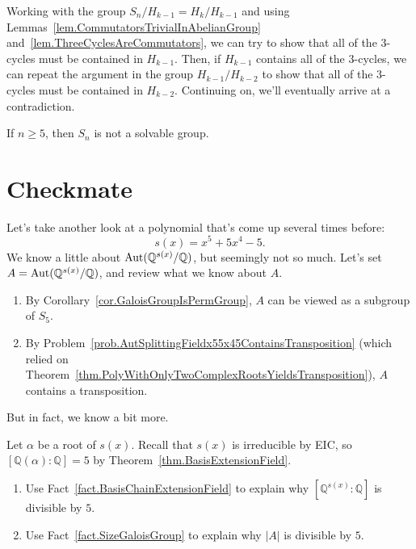 Working with the group $S_n/ H_{k-1} = H_k/ H_{k-1}$ and using Lemmas~\ref{lem.CommutatorsTrivialInAbelianGroup} and~\ref{lem.ThreeCyclesAreCommutators}, we can try to show that all of the $3$-cycles must be contained in $H_{k-1}$. Then, if $H_{k-1}$ contains all of the $3$-cycles, we can repeat the argument in the group $H_{k-1}/ H_{k-2}$ to show that all of the $3$-cycles must be contained in $H_{k-2}$. Continuing on, we'll eventually arrive at a contradiction.

\begin{theorem}\label{thm.SnNotSolvableIfNGreaterThan4}
If $n\ge 5$, then $S_n$ is not a solvable group.
\end{theorem}

\section{Checkmate}

Let's take another look at a polynomial that's come up several times before: \[s(x) = x^5 +5x^4-5.\] We know a little about $\operatorname{Aut}(\mathbb{Q}^{s(x)}/\mathbb{Q})$, but seemingly not so much. Let's set $A = \operatorname{Aut}(\mathbb{Q}^{s(x)}/\mathbb{Q})$, and review what we know about $A$.

\begin{enumerate}[label = \textbf{\Roman*.}]
\item By Corollary~\ref{cor.GaloisGroupIsPermGroup}, $A$ can be viewed as a subgroup of $S_5$.
\item By Problem~\ref{prob.AutSplittingFieldx55x45ContainsTransposition} (which relied on Theorem~\ref{thm.PolyWithOnlyTwoComplexRootsYieldsTransposition}), $A$ contains a transposition.
\end{enumerate}

But in fact, we know a bit more. 

\begin{problem}\label{prob.EndGameOrderGDivisibleBy5}
Let $\alpha$ be a root of $s(x)$. Recall that $s(x)$ is irreducible by EIC, so $[\mathbb{Q}(\alpha):\mathbb{Q}] = 5$ by Theorem~\ref{thm.BasisExtensionField}.
\begin{enumerate}
\item Use Fact~\ref{fact.BasisChainExtensionField} to explain why $[\mathbb{Q}^{s(x)}:\mathbb{Q}]$ is divisible by $5$.
\item Use Fact~\ref{fact.SizeGaloisGroup} to explain why $|A|$ is divisible by $5$.
\end{enumerate}
\end{problem}

